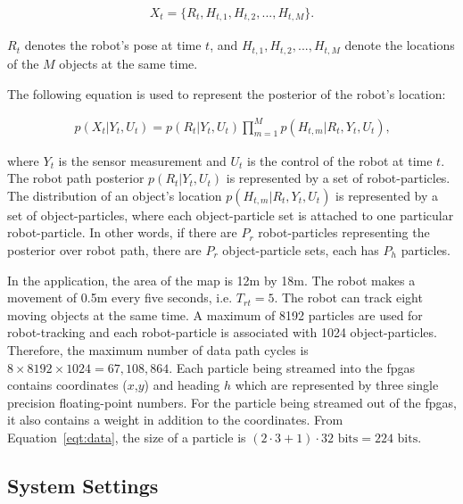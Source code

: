 \begin{equation}
\begin{aligned}
X_t = \{R_t, H_{t,1}, H_{t,2}, ..., H_{t,M}\} \mbox{.}
\end{aligned}
\end{equation}

$R_t$ denotes the robot's pose at time $t$, and $H_{t,1}, H_{t,2}, ..., H_{t,M}$ denote the locations of the $M$ objects at the same time.

The following equation is used to represent the posterior of the robot's location:

\begin{equation}
\begin{aligned}
p(X_t|Y_t,U_t) = p(R_t|Y_t,U_t) \prod_{m=1}^M p(H_{t,m}|R_t,Y_t,U_t) \mbox{,}
\end{aligned}
\end{equation}

where $Y_t$ is the sensor measurement and $U_t$ is the control of the robot at time $t$.
The robot path posterior $p(R_t|Y_t,U_t)$ is represented by a set of robot-particles.
The distribution of an object's location $p(H_{t,m}|R_t,Y_t,U_t)$ is represented by a set of object-particles, where each object-particle set is attached to one particular robot-particle.
In other words, if there are $P_r$ robot-particles representing the posterior over robot path, there are $P_r$ object-particle sets, each has $P_h$ particles.

In the application, the area of the map is 12m by 18m.
The robot makes a movement of 0.5m every five seconds, i.e. $T_{rt} = 5$.
The robot can track eight moving objects at the same time.
A maximum of 8192 particles are used for robot-tracking and each robot-particle is associated with 1024 object-particles.
Therefore, the maximum number of data path cycles is $8 \times 8192 \times 1024=67,108,864$.
Each particle being streamed into the \glspl{fpga} contains coordinates ($x$,$y$) and heading $h$ which are represented by three single precision floating-point numbers.
For the particle being streamed out of the \glspl{fpga}, it also contains a weight in addition to the coordinates.
From Equation~\ref{eqt:data}, the size of a particle is $(2 \cdot 3 + 1) \cdot 32 \mbox{ bits} = 224 \mbox{ bits}$.

\subsection{System Settings}

